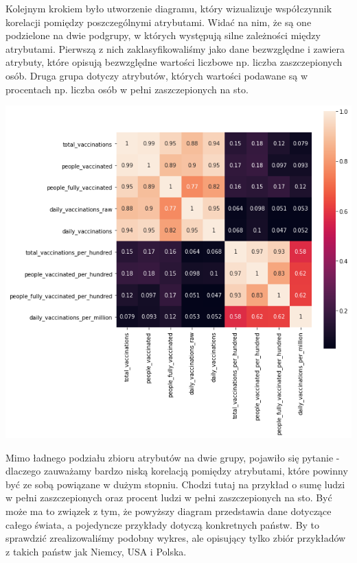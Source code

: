\documentclass[12pt, oneside, openany]{article}
\begin{document}
Kolejnym krokiem było utworzenie diagramu, który wizualizuje współczynnik korelacji pomiędzy poszczególnymi atrybutami. Widać na nim, że są one podzielone na dwie podgrupy, w których występują silne zależności między atrybutami. Pierwszą z nich zaklasyfikowaliśmy jako dane bezwzględne i zawiera atrybuty, które opisują bezwzględne wartości liczbowe np. liczba zaszczepionych osób. Druga grupa dotyczy atrybutów, których wartości podawane są w procentach np. liczba osób w pełni zaszczepionych na sto. 

\begin{center}
\includegraphics[scale=0.7]
{../img/corelation.png} 
\end{center}

Mimo ładnego podziału zbioru atrybutów na dwie grupy, pojawiło się pytanie - dlaczego zauważamy bardzo niską korelacją pomiędzy atrybutami, które powinny być ze sobą powiązane w dużym stopniu. Chodzi tutaj na przykład o sumę ludzi w pełni zaszczepionych oraz procent ludzi w pełni zaszczepionych na sto. Być może ma to związek z tym, że powyższy diagram przedstawia dane dotyczące całego świata, a pojedyncze przykłady dotyczą konkretnych państw. By to sprawdzić zrealizowaliśmy podobny wykres, ale opisujący  tylko zbiór przykładów z takich państw jak Niemcy, USA i Polska.
\end{document}
